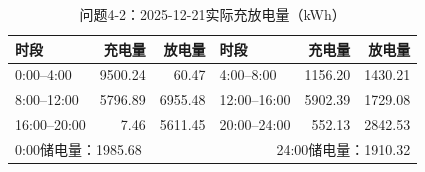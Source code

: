 \begin{table}[H]\centering\small
\caption{问题4-2：2025-12-21实际充放电量（kWh）}
\label{tab:q4_2_1221_storage}
\begin{tabular}{lrrlrr}\toprule
时段 & 充电量 & 放电量 & 时段 & 充电量 & 放电量\\\midrule
0:00--4:00 & 9500.24 & 60.47 & 4:00--8:00 & 1156.20 & 1430.21 \\
8:00--12:00 & 5796.89 & 6955.48 & 12:00--16:00 & 5902.39 & 1729.08 \\
16:00--20:00 & 7.46 & 5611.45 & 20:00--24:00 & 552.13 & 2842.53 \\
\midrule\multicolumn{3}{l}{0:00储电量：1985.68} & \multicolumn{3}{r}{24:00储电量：1910.32}\\
\bottomrule\end{tabular}\end{table}
